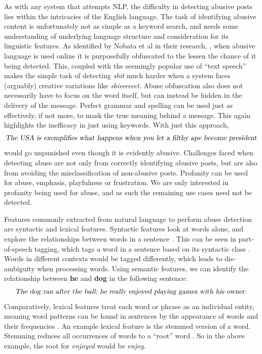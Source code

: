 As with any system that attempts NLP, the difficulty in detecting abusive posts lies within the intricacies of the English language. The task of identifying abusive content is unfortunately not as simple as a keyword search, and needs some understanding of underlying language structure and consideration for its linguistic features. As identified by Nobata et al in their research, \cite{nobata2016abusive}, when abusive language is used online it is purposefully obfuscated to the lessen the chance of it being detected. This, coupled with the seemingly popular use of ``text speech'' makes the simple task of detecting \emph{shit} much harder when a system faces (arguably) creative variations like \emph{shieeeeeet}. Abuse obfuscation also does not necessarily have to focus on the word itself, but can instead be hidden in the delivery of the message. Perfect grammar and spelling can be used just as effectively, if not more, to mask the true meaning behind a message. This again highlights the inefficacy in just using keywords. With just this approach,
\begin{equation}
\label{eq:rude}
\mbox{\textsl{The USA is exemplifies what happens when you let a filthy ape become president}}
\end{equation}
would go unpunished even though it is evidently abusive. Challenges faced when detecting abuse are not only from correctly identifying abusive posts, but are also from avoiding the misclassification of non-abusive posts. Profanity can be used for abuse, emphasis, playfulness or frustration. We are only interested in profanity being used for abuse, and as such the remaining use cases need not be detected. 

Features commonly extracted from natural language to perform abuse detection are syntactic and lexical features. Syntactic features look at words alone, and explore the relationships between words in a sentence \cite{liao2010large}. This can be seen in part-of-speech tagging, which tags a word in a sentence based on its syntactic class . Words in different contexts would be tagged differently, which leads to dis-ambiguity when processing words. Using semantic features, we can identify the relationship between \textbf{he} and \textbf{dog} in the following sentence:
\begin{equation}
\label{eq:semantic}
\mbox{\textsl{The dog ran after the ball; he really enjoyed playing games with his owner.}}
\end{equation}
Comparatively, lexical features treat each word or phrase as an individual entity, meaning word patterns can be found in sentences by the appearance of words and their frequencies \cite{chen2012detecting}. An example lexical feature is the stemmed version of a word. Stemming reduces all occurrences of words to a ``root'' word \cite{Elastic:Stem}. So in the above example, the root for \emph{enjoyed} would be \emph{enjoy}. 


